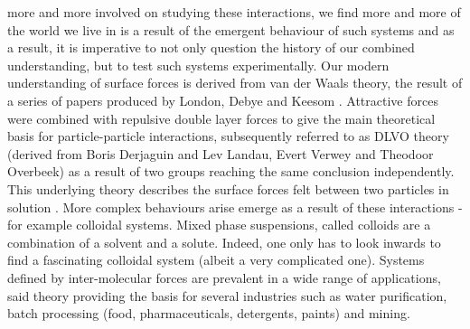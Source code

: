 more and more involved on 
studying these interactions,
 we find more and more of the world we live in is 
a result of the emergent behaviour of such systems and as a result, it is imperative to not only question the history of our combined understanding, but to test such systems experimentally.
Our modern understanding of surface forces is derived from van der Waals 
theory,
the result of a series of papers produced by London, Debye and Keesom \cite{AFMvdW}. %
Attractive forces were combined with repulsive double layer forces to %
give the main theoretical basis %
for particle-particle interactions, %
subsequently %
referred to as DLVO theory (derived from Boris Derjaguin and Lev Landau, Evert Verwey and Theodoor Overbeek) as a result of two groups reaching the same conclusion independently\cite{Verwey}\cite{DERJAGUIN}. This underlying theory describes the %
surface forces felt between two particles in solution .
More complex behaviours arise emerge as a result of these interactions - for example %
colloidal systems. Mixed phase suspensions, called colloids are a combination of a solvent and a solute. Indeed, one only has to look inwards to find a fascinating colloidal system (albeit a very complicated one). \cite{surfThesis} \cite{christian2018a}
Systems defined by inter-molecular forces are prevalent in a wide range of applications, said theory providing the basis for several industries such as water purification, batch processing (food, pharmaceuticals, detergents, paints) and mining.\cite{TABOR19772}
